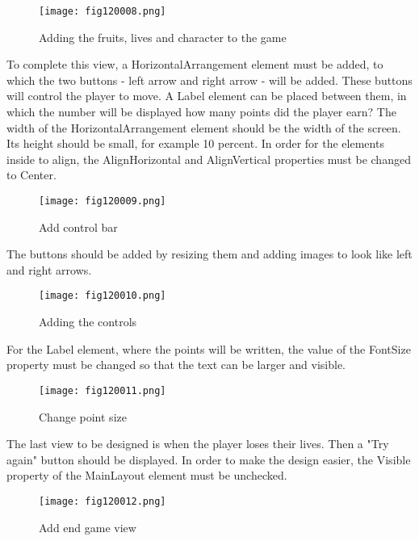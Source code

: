 \begin{figure}[H]
   \centering
   \texttt{[image: fig120008.png]}
   \caption{Adding the fruits, lives and character to the game}
\label{fig120008}
\end{figure}

To complete this view, a HorizontalArrangement element must be added, to which the two buttons - left arrow and right arrow - will be added. These buttons will control the player to move. A Label element can be placed between them, in which the number will be displayed how many points did the player earn?
The width of the HorizontalArrangement element should be the width of the screen. Its height should be small, for example 10 percent. In order for the elements inside to align, the AlignHorizontal and AlignVertical properties must be changed to Center.

\begin{figure}[H]
   \centering
   \texttt{[image: fig120009.png]}
   \caption{Add control bar}
\label{fig120009}
\end{figure}

The buttons should be added by resizing them and adding images to look like left and right arrows.

\begin{figure}[H]
   \centering
   \texttt{[image: fig120010.png]}
   \caption{Adding the controls}
\label{fig120010}
\end{figure}

For the Label element, where the points will be written, the value of the FontSize property must be changed so that the text can be larger and visible.

\begin{figure}[H]
   \centering
   \texttt{[image: fig120011.png]}
   \caption{Change point size}
\label{fig120011}
\end{figure}

The last view to be designed is when the player loses their lives. Then a "Try again" button should be displayed. In order to make the design easier, the Visible property of the MainLayout element must be unchecked.

\begin{figure}[H]
   \centering
   \texttt{[image: fig120012.png]}
   \caption{Add end game view}
\label{fig120012}
\end{figure}

